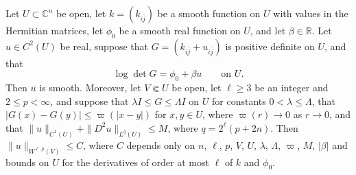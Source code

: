 \begin{lemma}\label{lem:penalized-local-regularity}
Let $U\subset\mathbb C^n$ be open, let $k=(k_{i\bar j})$ be a smooth function on $U$ with values in the Hermitian matrices, let $\phi_0$ be a smooth real function on $U$, and let $\beta\in\mathbb R$. Let $u\in C^2(U)$ be real, suppose that $G=(k_{i\bar j}+u_{i\bar j})$ is positive definite on $U$, and that
\begin{equation}\label{eq:penalized-local-equation}
 \log\det G=\phi_0+\beta u\qquad\text{on }U.
\end{equation}
Then $u$ is smooth. Moreover, let $V\Subset U$ be open, let $\ell\geq3$ be an integer and $2\leq p<\infty$, and suppose that $\lambda I\leq G\leq\Lambda I$ on $U$ for constants $0<\lambda\leq\Lambda$, that $|G(x)-G(y)|\leq\varpi(|x-y|)$ for $x,y\in U$, where $\varpi(r)\to0$ as $r\to0$, and that $\|u\|_{C^1(U)}+\|D^2u\|_{L^q(U)}\leq M$, where $q=2^\ell(p+2n)$. Then $\|u\|_{W^{\ell,p}(V)}\leq C$, where $C$ depends only on $n$, $\ell$, $p$, $V$, $U$, $\lambda$, $\Lambda$, $\varpi$, $M$, $|\beta|$ and bounds on $U$ for the derivatives of order at most $\ell$ of $k$ and $\phi_0$.
\end{lemma}

